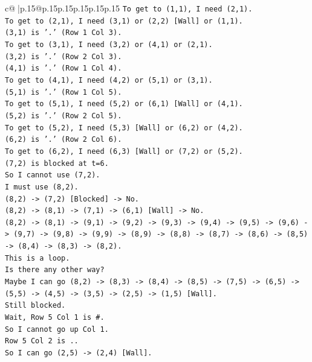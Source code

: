 \documentclass{article}
\begin{document}
{\begin{supertabular}{c@{$\;$}|p{.15\linewidth}@{}p{.15\linewidth}p{.15\linewidth}p{.15\linewidth}p{.15\linewidth}p{.15\linewidth}}
{{{\texttt{To get to (1,1), I need (2,1).} \\
\texttt{To get to (2,1), I need (3,1) or (2,2) {[}Wall{]} or (1,1).} \\
\texttt{(3,1) is '.' (Row 1 Col 3).} \\
\texttt{To get to (3,1), I need (3,2) or (4,1) or (2,1).} \\
\texttt{(3,2) is '.' (Row 2 Col 3).} \\
\texttt{(4,1) is '.' (Row 1 Col 4).} \\
\texttt{To get to (4,1), I need (4,2) or (5,1) or (3,1).} \\
\texttt{(5,1) is '.' (Row 1 Col 5).} \\
\texttt{To get to (5,1), I need (5,2) or (6,1) {[}Wall{]} or (4,1).} \\
\texttt{(5,2) is '.' (Row 2 Col 5).} \\
\texttt{To get to (5,2), I need (5,3) {[}Wall{]} or (6,2) or (4,2).} \\
\texttt{(6,2) is '.' (Row 2 Col 6).} \\
\texttt{To get to (6,2), I need (6,3) {[}Wall{]} or (7,2) or (5,2).} \\
\texttt{(7,2) is blocked at t=6.} \\
\texttt{So I cannot use (7,2).} \\
\texttt{I must use (8,2).} \\
\texttt{(8,2) {-}> (7,2) {[}Blocked{]} {-}> No.} \\
\texttt{(8,2) {-}> (8,1) {-}> (7,1) {-}> (6,1) {[}Wall{]} {-}> No.} \\
\texttt{(8,2) {-}> (8,1) {-}> (9,1) {-}> (9,2) {-}> (9,3) {-}> (9,4) {-}> (9,5) {-}> (9,6) {-}> (9,7) {-}> (9,8) {-}> (9,9) {-}> (8,9) {-}> (8,8) {-}> (8,7) {-}> (8,6) {-}> (8,5) {-}> (8,4) {-}> (8,3) {-}> (8,2).} \\
\texttt{This is a loop.} \\
\texttt{Is there any other way?} \\
\texttt{Maybe I can go (8,2) {-}> (8,3) {-}> (8,4) {-}> (8,5) {-}> (7,5) {-}> (6,5) {-}> (5,5) {-}> (4,5) {-}> (3,5) {-}> (2,5) {-}> (1,5) {[}Wall{]}.} \\
\texttt{Still blocked.} \\
\texttt{Wait, Row 5 Col 1 is \#.} \\
\texttt{So I cannot go up Col 1.} \\
\texttt{Row 5 Col 2 is ..} \\
\texttt{So I can go (2,5) {-}> (2,4) {[}Wall{]}.} \\
}}}
\end{supertabular}}
\end{document}
